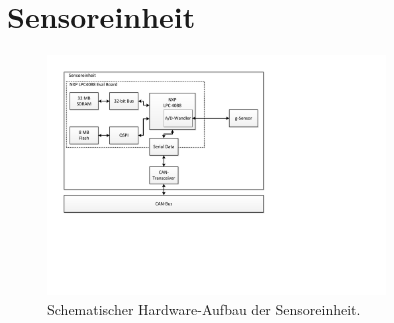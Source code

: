 \section{Sensoreinheit}

\begin{figure}[H]
	\centering
		\includegraphics[width=0.8\textwidth]{images/visio/hardware_sensor.pdf}
	\caption{Schematischer Hardware-Aufbau der Sensoreinheit.}
	\label{fig.hw_sensor}
\end{figure}


